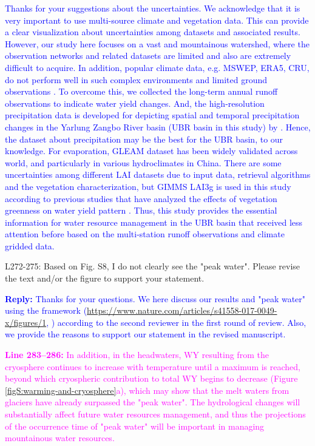\documentclass[11pt]{article}
\newcounter{reviewer}
\newcounter{point}[reviewer]
\renewcommand{\thepoint}{Comment\,\thereviewer.\arabic{point}:}
\newcommand{\point}[1]{\refstepcounter{point} \bigskip \noindent {\fontseries{b}\selectfont \thepoint} #1 \par}
\newcommand{\reply}[1]{\bigskip \textcolor{blue}{\noindent \textbf {Reply:} #1}}
\newcommand{\nextreply}[1]{\bigskip \textcolor{blue}{\noindent #1}}
\newcommand{\revised}[3][2]{\bigskip \textcolor{magenta}{\noindent \textbf{Line #2:} #3}}
\begin{document}
\nextreply{Thanks for your suggestions about the uncertainties. We acknowledge that it is very important to use multi-source climate and vegetation data. This can provide a clear visualization about uncertainties among datasets and associated results. However, our study here focuses on a vast and mountainous watershed, where the observation networks and related datasets are limited and also are extremely difficult to acquire. In addition, popular climate data, e.g. MSWEP, ERA5, CRU, do not perform well in such complex environments and limited ground observations \citep{sun2020precipitation}. To overcome this, we collected the long-term annual runoff observations to indicate water yield changes. And, the high-resolution precipitation data is developed for depicting spatial and temporal precipitation changes in the Yarlung Zangbo River basin (UBR basin in this study) by \citealt{sun2020precipitation}. Hence, the dataset about precipitation may be the best for the UBR basin, to our knowledge. For evaporation, GLEAM dataset has been widely validated across world, and particularly in various hydroclimates in China. There are some uncertainties among different LAI datasets due to input data, retrieval algorithms and the vegetation characterization, but GIMMS LAI3g is used in this study according to previous studies that have analyzed the effects of vegetation greenness on water yield pattern \citep{zhu2016greening, forzieri2020increased, gonsamo2021greening}. Thus, this study provides the essential information for water resource management in the UBR basin that received less attention before based on the multi-station runoff observations and climate gridded data.}

\point{L272-275: Based on Fig. S8, I do not clearly see the "peak water". Please revise the text and/or the figure to support your statement.}
\reply{Thanks for your questions. We here discuss our results and "peak water" using the framework (\url{https://www.nature.com/articles/s41558-017-0049-x/figures/1}, \citealp*{huss2018global}) according to the second reviewer in the first round of review. Also, we provide the reasons to support our statement in the revised manuscript.}

\revised{283--286}{In addition, in the headwaters, WY resulting from the cryosphere continues to increase with temperature until a maximum is reached, beyond which cryospheric contribution to total WY begins to decrease (Figure \ref{figS:warming-and-cryosphere}a), which may show that the melt waters from glaciers have already surpassed the "peak water". The hydrological changes will substantially affect future water resources management, and thus the projections of the occurrence time of "peak water" will be important in managing mountainous water resources.}
\end{document}
